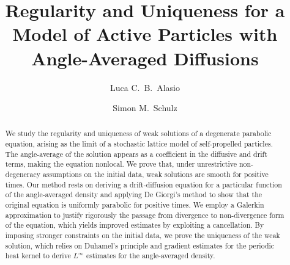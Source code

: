 \documentclass[11pt,a4paper,reqno]{amsart}
\theoremstyle{remark}
\theoremstyle{definition}
\numberwithin{equation}{section}
\begin{document}
%
\title[Regularity and Uniqueness for a Model of Active Particles]{Regularity and Uniqueness for a Model of Active Particles with Angle-Averaged Diffusions
}

\author[L.~C.~B.~Alasio]{Luca C.~B.~Alasio}
\address[L.~C.~B.~Alasio]{
INRIA, Laboratoire Jacques-Louis Lions (LJLL), Sorbonne Universit\'e, Universit\'e Paris Cit\'e, CNRS, 4 Place Jussieu, 75005 Paris, France}





\author[S.~M.~Schulz]{Simon M.~Schulz}
\address[S.~M.~Schulz]{Scuola Normale Superiore, Centro di Ricerca Matematica Ennio De Giorgi, Piazza dei Cavalieri, 3,  56126 Pisa, Italy}





\begin{abstract}
  We study the regularity and uniqueness of weak solutions of a degenerate parabolic equation, arising as the limit of a stochastic lattice model of self-propelled particles. The angle-average of the solution appears as a coefficient in the diffusive and drift terms, making the equation nonlocal. We prove that, under unrestrictive non-degeneracy assumptions on the initial data, weak solutions are smooth for positive times. Our method rests on deriving a drift-diffusion equation for a particular function of the angle-averaged density and applying De Giorgi's method to show that the original equation is uniformly parabolic for positive times. We employ a Galerkin approximation to justify rigorously the passage from divergence to non-divergence form of the equation, which yields improved estimates by exploiting a cancellation. By imposing stronger constraints on the initial data, we prove the uniqueness of the weak solution, which relies on Duhamel's principle and gradient estimates for the periodic heat kernel to derive $L^\infty$ estimates for the angle-averaged density. 
\end{abstract}

\maketitle
\end{document}
